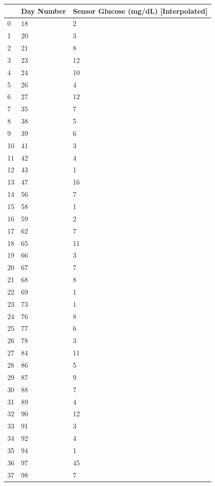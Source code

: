 \bigskip\noindent
\begin{tabular}{p{}p{}p{}}
\toprule
 & Day Number & Sensor Glucose (mg/dL) [Interpolated] \\
\hline
0 & 18 & 2 \\
\hline
1 & 20 & 3 \\
\hline
2 & 21 & 8 \\
\hline
3 & 23 & 12 \\
\hline
4 & 24 & 10 \\
\hline
5 & 26 & 4 \\
\hline
6 & 27 & 12 \\
\hline
7 & 35 & 7 \\
\hline
8 & 38 & 5 \\
\hline
9 & 39 & 6 \\
\hline
10 & 41 & 3 \\
\hline
11 & 42 & 4 \\
\hline
12 & 43 & 1 \\
\hline
13 & 47 & 16 \\
\hline
14 & 56 & 7 \\
\hline
15 & 58 & 1 \\
\hline
16 & 59 & 2 \\
\hline
17 & 62 & 7 \\
\hline
18 & 65 & 11 \\
\hline
19 & 66 & 3 \\
\hline
20 & 67 & 7 \\
\hline
21 & 68 & 8 \\
\hline
22 & 69 & 1 \\
\hline
23 & 73 & 1 \\
\hline
24 & 76 & 8 \\
\hline
25 & 77 & 6 \\
\hline
26 & 78 & 3 \\
\hline
27 & 84 & 11 \\
\hline
28 & 86 & 5 \\
\hline
29 & 87 & 9 \\
\hline
30 & 88 & 7 \\
\hline
31 & 89 & 4 \\
\hline
32 & 90 & 12 \\
\hline
33 & 91 & 3 \\
\hline
34 & 92 & 4 \\
\hline
35 & 94 & 1 \\
\hline
36 & 97 & 45 \\
\hline
37 & 98 & 7 \\

\end{tabular}
